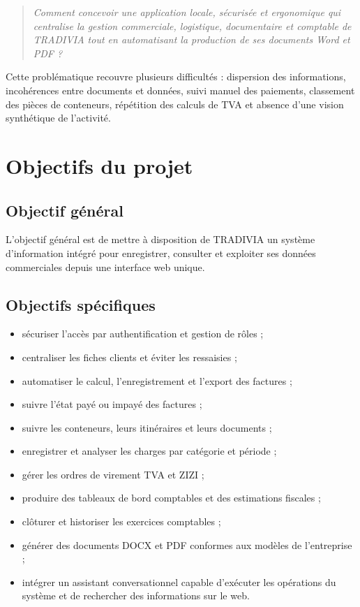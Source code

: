 \documentclass[12pt,a4paper,oneside]{report}
\begin{document}
\begin{quote}
\textit{Comment concevoir une application locale, sécurisée et ergonomique qui centralise la gestion commerciale, logistique, documentaire et comptable de TRADIVIA tout en automatisant la production de ses documents Word et PDF ?}
\end{quote}

Cette problématique recouvre plusieurs difficultés : dispersion des informations, incohérences entre documents et données, suivi manuel des paiements, classement des pièces de conteneurs, répétition des calculs de TVA et absence d'une vision synthétique de l'activité.

\section{Objectifs du projet}
\subsection{Objectif général}
L'objectif général est de mettre à disposition de TRADIVIA un système d'information intégré pour enregistrer, consulter et exploiter ses données commerciales depuis une interface web unique.

\subsection{Objectifs spécifiques}
\begin{itemize}
  \item sécuriser l'accès par authentification et gestion de rôles ;
  \item centraliser les fiches clients et éviter les ressaisies ;
  \item automatiser le calcul, l'enregistrement et l'export des factures ;
  \item suivre l'état payé ou impayé des factures ;
  \item suivre les conteneurs, leurs itinéraires et leurs documents ;
  \item enregistrer et analyser les charges par catégorie et période ;
  \item gérer les ordres de virement TVA et ZIZI ;
  \item produire des tableaux de bord comptables et des estimations fiscales ;
  \item clôturer et historiser les exercices comptables ;
  \item générer des documents DOCX et PDF conformes aux modèles de l'entreprise ;
  \item intégrer un assistant conversationnel capable d'exécuter les opérations du système et de rechercher des informations sur le web.
\end{itemize}
\end{document}
